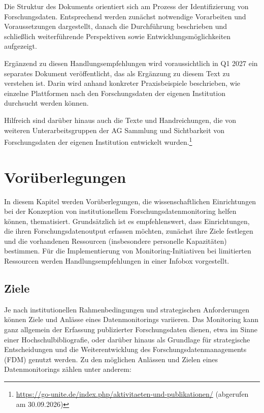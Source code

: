\documentclass[
  ngerman,
  letterpaper,
  DIV=11]{scrreprt}
\begin{document}
Die Struktur des Dokuments orientiert sich am Prozess der
Identifizierung von Forschungsdaten. Entsprechend werden zunächst
notwendige Vorarbeiten und Voraussetzungen dargestellt, danach die
Durchführung beschrieben und schließlich weiterführende Perspektiven
sowie Entwicklungsmöglichkeiten aufgezeigt.

Ergänzend zu diesen Handlungsempfehlungen wird voraussichtlich in Q1
2027 ein separates Dokument veröffentlicht, das als Ergänzung zu diesem
Text zu verstehen ist. Darin wird anhand konkreter Praxisbeispiele
beschrieben, wie einzelne Plattformen nach den Forschungsdaten der
eigenen Institution durchsucht werden können.

Hilfreich sind darüber hinaus auch die Texte und Handreichungen, die von
weiteren Unterarbeitsgruppen der AG Sammlung und Sichtbarkeit von
Forschungsdaten der eigenen Institution entwickelt wurden.\footnote{\url{https://go-unite.de/index.php/aktivitaeten-und-publikationen/}
  (abgerufen am 30.09.2026)}

\chapter{Vorüberlegungen}\label{voruxfcberlegungen}

In diesem Kapitel werden Vorüberlegungen, die wissenschaftlichen
Einrichtungen bei der Konzeption von institutionellem
Forschungsdatenmonitoring helfen können, thematisiert. Grundsätzlich ist
es empfehlenswert, dass Einrichtungen, die ihren Forschungsdatenoutput
erfassen möchten, zunächst ihre Ziele festlegen und die vorhandenen
Ressourcen (insbesondere personelle Kapazitäten) bestimmen. Für die
Implementierung von Monitoring-Initiativen bei limitierten Ressourcen
werden Handlungsempfehlungen in einer Infobox vorgestellt.

\section{Ziele}\label{ziele}

Je nach institutionellen Rahmenbedingungen und strategischen
Anforderungen können Ziele und Anlässe eines Datenmonitorings variieren.
Das Monitoring kann ganz allgemein der Erfassung publizierter
Forschungsdaten dienen, etwa im Sinne einer Hochschulbibliografie, oder
darüber hinaus als Grundlage für strategische Entscheidungen und die
Weiterentwicklung des Forschungsdatenmanagements (FDM) genutzt werden.
Zu den möglichen Anlässen und Zielen eines Datenmonitorings zählen unter
anderem:
\end{document}
